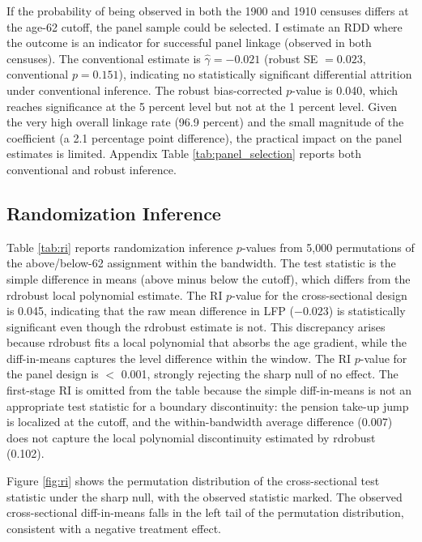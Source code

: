\documentclass[12pt]{article}
\begin{document}
If the probability of being observed in both the 1900 and 1910 censuses differs at the age-62 cutoff, the panel sample could be selected. I estimate an RDD where the outcome is an indicator for successful panel linkage (observed in both censuses). The conventional estimate is $\hat{\gamma} = -0.021$ (robust SE $= 0.023$, conventional $p = 0.151$), indicating no statistically significant differential attrition under conventional inference. The robust bias-corrected $p$-value is 0.040, which reaches significance at the 5 percent level but not at the 1 percent level. Given the very high overall linkage rate (96.9 percent) and the small magnitude of the coefficient (a 2.1 percentage point difference), the practical impact on the panel estimates is limited. Appendix Table \ref{tab:panel_selection} reports both conventional and robust inference.

\subsection{Randomization Inference}

Table \ref{tab:ri} reports randomization inference $p$-values from 5,000 permutations of the above/below-62 assignment within the bandwidth. The test statistic is the simple difference in means (above minus below the cutoff), which differs from the rdrobust local polynomial estimate. The RI $p$-value for the cross-sectional design is 0.045, indicating that the raw mean difference in LFP ($-0.023$) is statistically significant even though the rdrobust estimate is not. This discrepancy arises because rdrobust fits a local polynomial that absorbs the age gradient, while the diff-in-means captures the level difference within the window. The RI $p$-value for the panel design is $<$ 0.001, strongly rejecting the sharp null of no effect. The first-stage RI is omitted from the table because the simple diff-in-means is not an appropriate test statistic for a boundary discontinuity: the pension take-up jump is localized at the cutoff, and the within-bandwidth average difference (0.007) does not capture the local polynomial discontinuity estimated by rdrobust (0.102).



Figure \ref{fig:ri} shows the permutation distribution of the cross-sectional test statistic under the sharp null, with the observed statistic marked. The observed cross-sectional diff-in-means falls in the left tail of the permutation distribution, consistent with a negative treatment effect.
\end{document}
